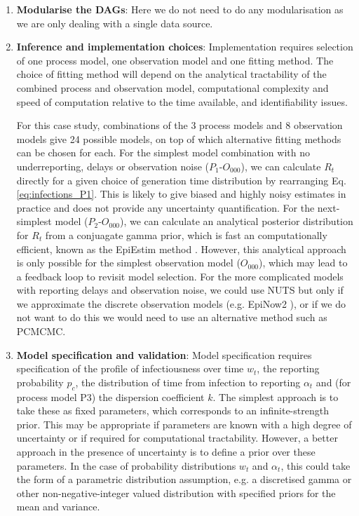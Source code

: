 \documentclass{article}
\begin{document}
\begin{enumerate}
 

\item \textbf{Modularise the DAGs}: Here we do not need to do any modularisation as we are only dealing with a single data source.

\item \textbf{Inference and implementation choices}: Implementation requires selection of one process model, one observation model and one fitting method. The choice of fitting method will depend on the analytical tractability of the combined process and observation model, computational complexity and speed of computation relative to the time available, and identifiability issues. 

For this case study, combinations of the 3 process models and 8 observation models give 24 possible models, on top of which alternative fitting methods can be chosen for each. For the simplest model combination with no underreporting, delays or observation noise ($P_1$-$O_{000}$), we can calculate $R_t$ directly for a given choice of generation time distribution by rearranging Eq. \eqref{eq:infections_P1}. This is likely to give biased and highly noisy estimates in practice and does not provide any uncertainty quantification. For the next-simplest model ($P_2$-$O_{000}$), we can calculate an analytical posterior distribution for $R_t$  from a conjuagate gamma prior, which is fast an computationally efficient, known as the EpiEstim method \cite{cori2013new}. However, this analytical approach is only possible for the simplest observation model ($O_{000}$), which may lead to a feedback loop to revisit model selection. 
For the more complicated models with reporting delays and observation noise, we could use NUTS but only if we approximate the discrete observation models (e.g. EpiNow2 \cite{abbott2020estimating}), or if we do not want to do this we would need to use an alternative method such as PCMCMC. 

\item \textbf{Model specification and validation}: Model specification requires specification of the profile of infectiousness over time $w_t$, the reporting probability $p_c$, the distribution of time from infection to reporting $\alpha_t$ and (for process model P3) the dispersion coefficient $k$. The simplest approach is to take these as fixed parameters, which corresponds to an infinite-strength prior. This may be appropriate if parameters are known with a high degree of uncertainty or if required for computational tractability. However, a better approach in the presence of uncertainty is to define a prior over these parameters. In the case of probability distributions $w_t$ and $\alpha_t$, this could take the form of a parametric distribution assumption, e.g. a discretised gamma or other non-negative-integer valued distribution with specified priors for the mean and variance. 


\end{enumerate}
\end{document}
